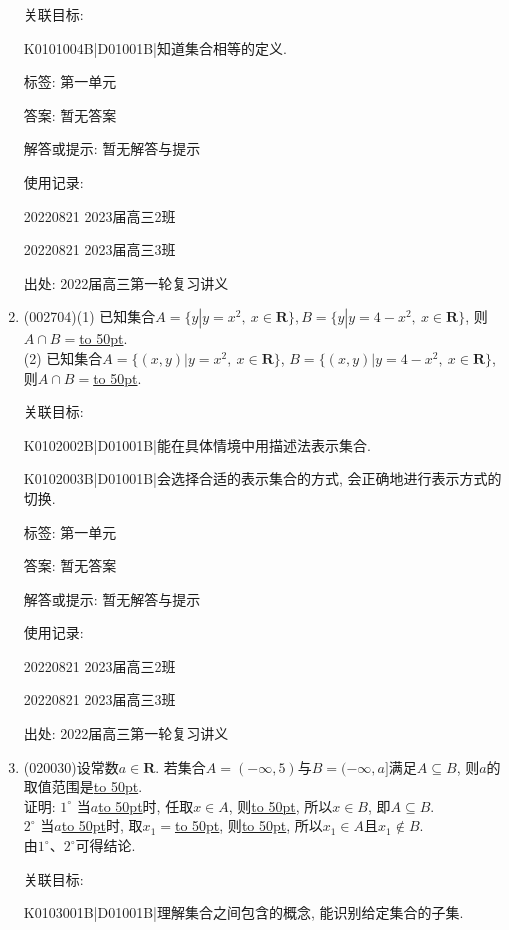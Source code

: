 \documentclass[10pt,a4paper]{article}
\newcommand{\blank}[1]{\underline{\hbox to #1pt{}}}
\begin{document}
\begin{enumerate}[1.]
关联目标:

K0101004B|D01001B|知道集合相等的定义.



标签: 第一单元

答案: 暂无答案

解答或提示: 暂无解答与提示

使用记录:

20220821	2023届高三2班	

20220821	2023届高三3班		


出处: 2022届高三第一轮复习讲义
\item { (002704)}(1) 已知集合$A=\{y|y=x^2, \ x\in \mathbf{R}\}, B=\{y|y=4-x^2, \ x\in \mathbf{R}\}$, 则$A\cap B=$\blank{50}.\\
(2) 已知集合$A=\{(x,y)|y={x^2},\ x\in \mathbf{R}\}$, $B=\{(x,y)|y=4-x^2, \ x\in \mathbf{R}\}$, 则$A\cap B=$\blank{50}.


关联目标:

K0102002B|D01001B|能在具体情境中用描述法表示集合.

K0102003B|D01001B|会选择合适的表示集合的方式, 会正确地进行表示方式的切换.



标签: 第一单元

答案: 暂无答案

解答或提示: 暂无解答与提示

使用记录:

20220821	2023届高三2班		

20220821	2023届高三3班	


出处: 2022届高三第一轮复习讲义
\item { (020030)}设常数$a\in \mathbf{R}$. 若集合$A=(-\infty ,5)$与$B=(-\infty ,a]$满足$A\subseteq B$, 则$a$的取值范围是\blank{50}.\\
证明: $1^\circ$ 当$a$\blank{50}时, 任取$x\in A$, 则\blank{50}, 所以$x\in B$, 即$A\subseteq B$.\\ 
$2^\circ$ 当$a$\blank{50}时, 取$x_1=$\blank{50}, 则\blank{50}, 所以$x_1\in A$且$x_1\not \in B$.\\
由$1^\circ$、$2^\circ$可得结论.


关联目标:

K0103001B|D01001B|理解集合之间包含的概念, 能识别给定集合的子集.




\end{enumerate}
\end{document}
